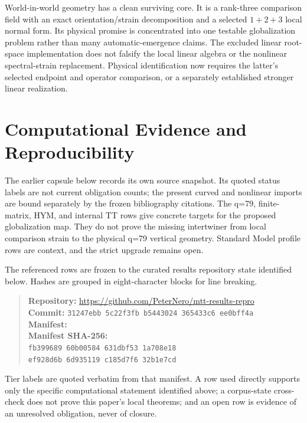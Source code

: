 \documentclass[11pt]{article}
\begin{document}
World-in-world geometry has a clean surviving core.  It is a rank-three
comparison field with an exact orientation/strain decomposition and a selected
$1+2+3$ local normal form.  Its physical promise is concentrated into one
testable globalization problem rather than many automatic-emergence claims.
The excluded linear root-space implementation does not falsify the local
linear algebra or the nonlinear spectral-strain replacement. Physical
identification now requires the latter's selected endpoint and operator
comparison, or a separately established stronger linear realization.

\section*{Computational Evidence and Reproducibility}
The earlier capsule below records its own source snapshot. Its quoted status
labels are not current obligation counts; the present curved and nonlinear
imports are bound separately by the frozen bibliography citations.
The q=79, finite-matrix, HYM, and internal TT rows give concrete targets for the proposed globalization map. They do not prove the missing intertwiner from local comparison strain to the physical q=79 vertical geometry. Standard Model profile rows are context, and the strict upgrade remains open.

The referenced rows are frozen to the curated results repository state identified below. Hashes are grouped in eight-character blocks for line breaking.
\begin{quote}\small
\textbf{Repository:} \url{https://github.com/PeterNero/mtt-results-repro}\\
\textbf{Commit:} \texttt{31247ebb 5c22f3fb b5443024 365433c6 ee0bff4a}\\
\textbf{Manifest:} \\
\textbf{Manifest SHA-256:}\\
\texttt{fb399689 60b00584 631dbf53 1a708e18}\\
\texttt{ef928d6b 6d935119 c185d7f6 32b1e7cd}
\end{quote}

Tier labels are quoted verbatim from that manifest. A row used directly supports only the specific computational statement identified above; a corpus-state cross-check does not prove this paper's local theorems; and an open row is evidence of an unresolved obligation, never of closure.
\end{document}
